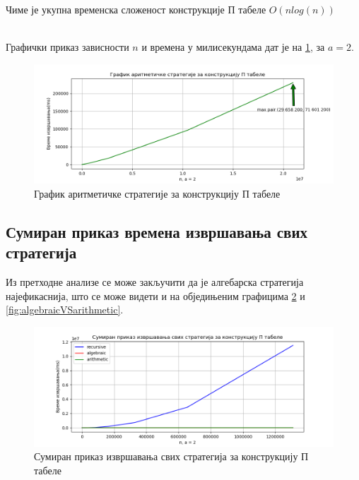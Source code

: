 \documentclass[a4paper]{article}
\begin{document}
Чиме је укупна временска сложеност конструкције П табеле $ O(nlog(n)) $



\leavevmode\\
Графички приказ зависности $ n $ и времена у милисекундама дат је на \ref{fig:arithmetic}, за $ a = 2 $.

\begin{figure}[H]
	\caption{График аритметичке стратегије за конструкцију П табеле}
	\label{fig:arithmetic}
	\begin{center}
		\includegraphics[width=\textwidth]{arithmetic.png}
	\end{center}
\end{figure}

\subsection{Сумиран приказ времена извршавања свих стратегија}

Из претходне анализе се може закључити да је алгебарска стратегија најефикаснија, што се може видети и на обједињеним графицима \ref{fig:all} и  \ref{fig:algebraicVSarithmetic}.

\begin{figure}[H]
	\caption{Сумиран приказ извршавања свих стратегија за конструкцију П табеле}
	\label{fig:all}
	\begin{center}
		\includegraphics[width=\textwidth]{all.png}
	\end{center}
\end{figure}
\end{document}
